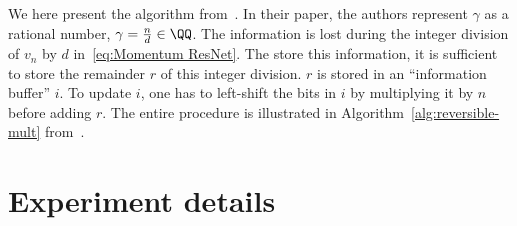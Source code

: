\documentclass{article}
\begin{document}
We here present the algorithm from~\citet{10.5555/3045118.3045343}. In their paper, the authors represent $\gamma$ as a rational number, $\gamma = \frac{n}{d} \in \QQ$. The information is lost during the integer division of $v_{n}$ by $d$ in~\eqref{eq:Momentum ResNet}. The store this information, it is sufficient to store the remainder $r$ of this integer division. $r$ is stored in an “information buffer” $i$. To update $i$, one has to left-shift the bits in $i$ by multiplying it by $n$ before adding $r$. The entire procedure is illustrated in Algorithm~\ref{alg:reversible-mult} from~\citet{10.5555/3045118.3045343}.
 






















\section{Experiment details}\label{app:experiment_details}
\end{document}
